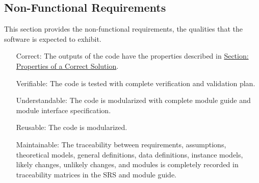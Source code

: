 \documentclass[12pt]{article}
\begin{document}
\subsection{Non-Functional Requirements}
\label{Sec:NFRs}
This section provides the non-functional requirements, the qualities that the software is expected to exhibit.
\begin{itemize}
\item[Correct:\phantomsection\label{correct}]The outputs of the code have the properties described in \hyperref[Sec:CorSolProps]{Section: Properties of a Correct Solution}.
\item[Verifiable:\phantomsection\label{verifiable}]The code is tested with complete verification and validation plan.
\item[Understandable:\phantomsection\label{understandable}]The code is modularized with complete module guide and module interface specification.
\item[Reusable:\phantomsection\label{reusable}]The code is modularized.
\item[Maintainable:\phantomsection\label{maintainable}]The traceability between requirements, assumptions, theoretical models, general definitions, data definitions, instance models, likely changes, unlikely changes, and modules is completely recorded in traceability matrices in the SRS and module guide.
\end{itemize}
\end{document}

